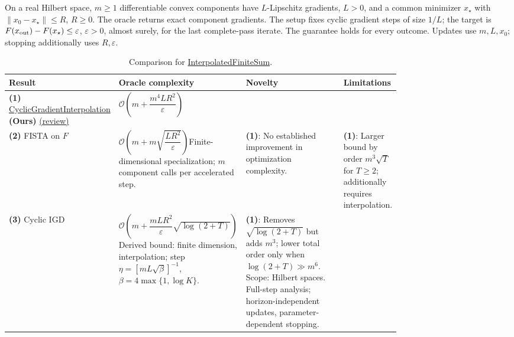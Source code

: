 \begin{table}[tp]
\centering
\caption{Comparison for \href{https://github.com/k3nfalt/longtails/blob/main/LongTails/Setups/InterpolatedFiniteSum.lean}{InterpolatedFiniteSum}.}\label{tab:InterpolatedFiniteSum}
\parbox{\linewidth}{\footnotesize On a real Hilbert space, $m\ge1$ differentiable convex components have $L$-Lipschitz gradients, $L>0$, and a common minimizer $x_\star$ with $\|x_0-x_\star\|\le R$, $R\ge0$. The oracle returns exact component gradients. The setup fixes cyclic gradient steps of size $1/L$; the target is $F(x_{\rm out})-F(x_\star)\le\varepsilon$, $\varepsilon>0$, almost surely, for the last complete-pass iterate. The guarantee holds for every outcome. Updates use $m,L,x_0$; stopping additionally uses $R,\varepsilon$.}\par\smallskip
\begin{threeparttable}
\footnotesize
\setlength{\tabcolsep}{4pt}\renewcommand{\arraystretch}{1.25}
\begin{tabularx}{\linewidth}{@{}>{\raggedright\arraybackslash}p{0.20\linewidth}>{\raggedright\arraybackslash}p{0.32\linewidth}>{\raggedright\arraybackslash}p{0.25\linewidth}>{\raggedright\arraybackslash}X@{}}
\toprule
\textbf{Result} & \textbf{Oracle complexity} & \textbf{Novelty} & \textbf{Limitations} \\
\midrule
\textbf{(1)} \href{https://github.com/k3nfalt/longtails/blob/main/LongTails/Theorems/CyclicGradientInterpolation.lean}{Cyclic\allowbreak{}Gradient\allowbreak{}Interpolation} \textbf{(Ours)} \href{https://github.com/k3nfalt/longtails/blob/main/scripts/reviews/CyclicGradientInterpolation.md}{(review)}
& $\mathcal{O}\!\left(m+\dfrac{m^4LR^2}{\varepsilon}\right)$ & & \\
\midrule[1.2pt]
\textbf{(2)} FISTA on $F$ \citep[Thm.~4.4]{ifsBeckTeboulle2009}
& $\mathcal{O}\!\left(m+m\sqrt{\dfrac{LR^2}{\varepsilon}}\right)$\newline Finite-dimensional specialization; $m$ component calls per accelerated step.
& \textbf{(1)}: No established improvement in optimization complexity.
& \textbf{(1)}: Larger bound by order $m^3\sqrt{T}$ for $T\ge2$; additionally requires interpolation. \\
\midrule
\textbf{(3)} Cyclic IGD \citep[Thm.~2.3]{ifsCaiDiakonikolas2024v2}
& $\mathcal{O}\!\left(m+\dfrac{mLR^2}{\varepsilon}\sqrt{\log(2+T)}\right)$\newline Derived bound: finite dimension, interpolation; step $\eta=[mL\sqrt{\beta}]^{-1}$, $\beta=4\max\{1,\log K\}$.
& \textbf{(1)}: Removes $\sqrt{\log(2+T)}$ but adds $m^3$; lower total order only when $\log(2+T)\gg m^6$. Scope: Hilbert spaces. Full-step analysis; horizon-independent updates, parameter-dependent stopping.

\end{tabularx}
\end{threeparttable}
\end{table}
